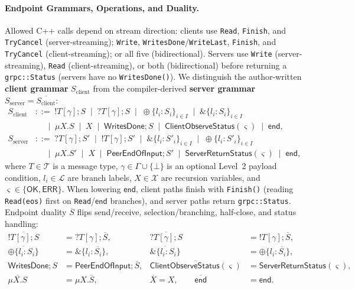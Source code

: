 \paragraph{Endpoint Grammars, Operations, and Duality.}
Allowed C++ calls depend on stream direction: clients use \texttt{Read}, \texttt{Finish}, and \texttt{TryCancel} (server-streaming); \texttt{Write}, \texttt{WritesDone}/\allowbreak\texttt{WriteLast}, \texttt{Finish}, and \texttt{TryCancel} (client-streaming); or all five (bidirectional). Servers use \texttt{Write} (server-streaming), \texttt{Read} (client-streaming), or both (bidirectional) before returning a \texttt{grpc::\allowbreak Status} (servers have no \texttt{WritesDone()}). We distinguish the author-written \textbf{client grammar} $S_{\mathrm{client}}$ from the compiler-derived \textbf{server grammar} $S_{\mathrm{server}} = \overline{S_{\mathrm{client}}}$:
\begin{equation}
\label{eq:session-grammar}
\begin{aligned}
S_{\mathrm{client}} &::=\; {!}T[\gamma]; S \;\mid\; {?}T[\gamma]; S \;\mid\; \oplus\{l_i : S_i\}_{i \in I} \;\mid\; \&\{l_i : S_i\}_{i \in I} \\
                   &\quad\;\mid\; \mu X. S \;\mid\; X \;\mid\; \mathsf{WritesDone}; S \;\mid\; \mathsf{ClientObserveStatus}(\varsigma) \;\mid\; \mathsf{end}, \\
S_{\mathrm{server}} &::=\; {?}T[\gamma]; S' \;\mid\; {!}T[\gamma]; S' \;\mid\; \&\{l_i : S'_i\}_{i \in I} \;\mid\; \oplus\{l_i : S'_i\}_{i \in I} \\
                   &\quad\;\mid\; \mu X. S' \;\mid\; X \;\mid\; \mathsf{PeerEndOfInput}; S' \;\mid\; \mathsf{ServerReturnStatus}(\varsigma) \;\mid\; \mathsf{end},
\end{aligned}
\end{equation}
where $T \in \mathcal{T}$ is a message type, $\gamma \in \Gamma \cup \{\bot\}$ is an optional Level~2 payload condition, $l_i \in \mathcal{L}$ are branch labels, $X \in \mathcal{X}$ are recursion variables, and $\varsigma \in \{\mathsf{OK}, \mathsf{ERR}\}$. When lowering $\mathsf{end}$, client paths finish with \texttt{Finish()} (reading \texttt{Read(eos)} first on \texttt{Read}/$\mathsf{end}$ branches), and server paths return \texttt{grpc::Status}. Endpoint duality $\overline{S}$ flips send/receive, selection/branching, half-close, and status handling:
\begin{align}
\overline{{!}T[\gamma]; S} &= {?}T[\gamma]; \overline{S}, &
\overline{{?}T[\gamma]; S} &= {!}T[\gamma]; \overline{S}, \nonumber \\
\overline{\oplus\{l_i : S_i\}} &= \&\{l_i : \overline{S_i}\}, &
\overline{\&\{l_i : S_i\}} &= \oplus\{l_i : \overline{S_i}\}, \nonumber \\
\overline{\mathsf{WritesDone}; S} &= \mathsf{PeerEndOfInput}; \overline{S}, &
\overline{\mathsf{ClientObserveStatus}(\varsigma)} &= \mathsf{ServerReturnStatus}(\varsigma), \label{eq:duality} \\
\overline{\mu X. S} &= \mu X. \overline{S}, &
\overline{X} = X, \qquad \overline{\mathsf{end}} &= \mathsf{end}. \nonumber
\end{align}
